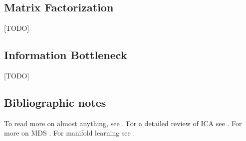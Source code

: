 \documentclass[12pt,a4paper]{article}
\begin{document}
\subsection{Matrix Factorization}
\label{sec:matrix_factorization}
[TODO]



\subsection{Information Bottleneck}
[TODO]

%
%
%


\begin{remark}
\end{remark}




\subsection{Bibliographic notes}
To read more on almost anything, see \citet{friedman2001elements}.
For a detailed review of ICA see \cite{hyvarinen2000independent}. 
For more on MDS \cite{borg2005modern}.
For manifold learning see \citet{mohri2012foundations}.
\end{document}
